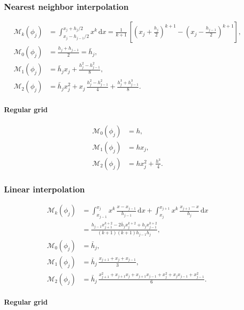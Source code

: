 \documentclass[a4paper]{paper}
\newcommand*{\OP}[1]{{\ensuremath{\mathcal{#1}}}}
\newcommand*{\OPM}{\OP{M}}
\newcommand*{\D}{{\ensuremath{\mathrm{d}}}}
\begin{document}
\subsubsection{Nearest neighbor interpolation}
\label{subsubsec:specif:moments:nn}

\begin{align*}
 \OPM_k(\phi_j) 
 &= \int_{x_j-h_{j-1}/2}^{x_j+h_j/2} x^k\, \D x 
 = \frac{1}{k+1}\, \left[ \left(x_j + \frac{h_j}{2}\right)^{k+1} - \left(x_j - \frac{h_{j-1}}{2}\right)^{k+1} \right], 
 \\
 \OPM_0(\phi_j) &= \frac{h_j + h_{j-1}}{2} = \bar h_j, \\
 \OPM_1(\phi_j) &= \bar h_j x_j + \frac{h_j^2 - h_{j-1}^2}{8}, \\
 \OPM_2(\phi_j) &= \bar h_j x_j^2 + x_j\, \frac{h_j^2 - h_{j-1}^2}{4} +  \frac{h_j^3 + h_{j-1}^3}{8}.
\end{align*}

\paragraph{Regular grid}

\begin{align*}
 \OPM_0(\phi_j) &= h, \\
 \OPM_1(\phi_j) &= h x_j, \\
 \OPM_2(\phi_j) &= h x_j^2 +  \frac{h^3}{4}.
\end{align*}


\subsubsection{Linear interpolation}
\label{subsubsec:specif:moments:linear}

\begin{align*}
 \OPM_k(\phi_j) 
 &= \int_{x_{j-1}}^{x_j} x^k\, \frac{x-x_{j-1}}{h_{j-1}}\, \D x + \int_{x_j}^{x_{j+1}} x^k\, \frac{x_{j+1}-x}{h_j}\, 
 \D x \\  
 &= \frac{h_{j-1} x_{j+1}^{k+2} - 2\bar h_j x_j^{k+2} + h_j x_{j-1}^{k+2}}{(k+1)(k+1) h_{j-1} h_j},
 \\
 \OPM_0(\phi_j) & = \bar h_j, \\
 \OPM_1(\phi_j) &= \bar h_j\, \frac{x_{j+1} + x_j + x_{j-1}}{3}, \\
 \OPM_2(\phi_j) &= \bar h_j\, \frac{x_{j+1}^2 + x_{j+1}x_j + x_{j+1}x_{j-1} + x_j^2 + x_jx_{j-1} + x_{j-1}^2}{6}.
\end{align*}

\paragraph{Regular grid}
\end{document}
